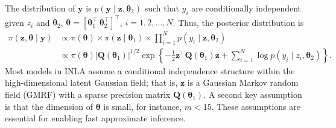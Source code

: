 The distribution of $\boldsymbol{y}$ is $p(\boldsymbol{y}\mid \boldsymbol{z},\boldsymbol{\theta}_2)$ such that $y_i$ are conditionally independent given $z_i$ and $\boldsymbol{\theta}_2$, $\boldsymbol{\theta}=[\boldsymbol{\theta}_1^{\top} \ \boldsymbol{\theta}_2^{\top}]^{\top}$, $i=1,2,\dots,N$. Thus, the posterior distribution is
\begin{align}\label{eq:INLA1}
	\pi(\boldsymbol{z},\boldsymbol{\theta}\mid \boldsymbol{y})&\propto \pi(\boldsymbol{\theta})\times \pi(\boldsymbol{z}\mid \boldsymbol{\theta}_1)\times \prod_{i=1}^{N}p(y_i\mid \boldsymbol{z},\boldsymbol{\theta}_2)\\
	&\propto \pi(\boldsymbol{\theta})|\boldsymbol{Q}(\boldsymbol{\theta}_1)|^{1/2}\exp\left\{-\frac{1}{2}\boldsymbol{z}^{\top}\boldsymbol{Q}(\boldsymbol{\theta}_1)\boldsymbol{z}+\sum_{i=1}^N\log p(y_i\mid z_i,\boldsymbol{\theta}_2)\right\}.\nonumber
\end{align}
Most models in INLA assume a conditional independence structure within the high-dimensional latent Gaussian field; that is, $\boldsymbol{z}$ is a Gaussian Markov random field (GMRF) with a sparse precision matrix $\boldsymbol{Q}(\boldsymbol{\theta}_1)$. A second key assumption is that the dimension of $\boldsymbol{\theta}$ is small, for instance, $m < 15$. These assumptions are essential for enabling fast approximate inference.

